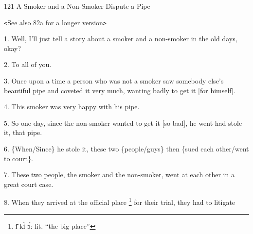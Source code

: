
121 A Smoker and a Non-Smoker Dispute a Pipe

\texttt{<}See also 82a for a longer version\texttt{>}

1. Well, I'll just tell a story about a smoker and a non-smoker in the old days,
okay?

2. To all of you.

3. Once upon a time a person who was not a smoker saw somebody else's beautiful
pipe and coveted it very much, wanting badly to get it [for himself].

4. This smoker was very happy with his pipe.

5. So one day, since the non-smoker wanted to get it [so bad], he went had stole
it, that pipe.

6. \{When/Since\} he stole it, these two \{people/guys\} then \{sued each other/went
to court\}.

7. These two people, the smoker and the non-smoker, went at each other in a great
court case.

8. When they arrived at the official place \footnote{ɨ̄ kɨ̀ ɔ́: lit. ``the big place''} for their trial, they had to litigate
